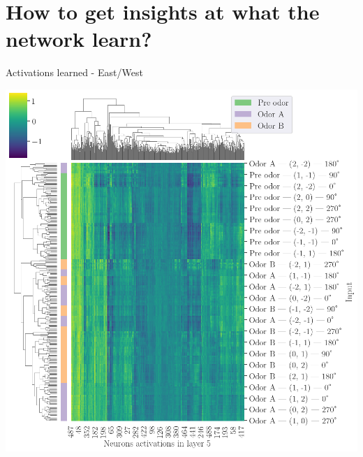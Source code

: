 \documentclass[bigger]{beamer}
\begin{document}
\section{How to get insights at what the network learn?}
\label{sec:org3ce42b2}
\begin{frame}[label={sec:orgc837b1b}]{Activations learned - East/West}
\begin{center}
\includegraphics[height=0.9\textheight]{img/activations-learned-EastWest.png}
\end{center}
\end{frame}
\end{document}
